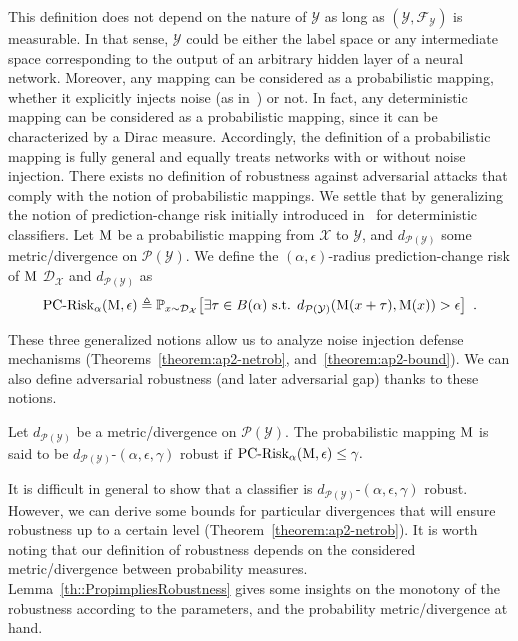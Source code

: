 This definition does not depend on the nature of $\mathcal{Y}$ as long as $(\mathcal{Y},\mathcal{F}_{\mathcal{Y}})$ is measurable.
In that sense, $\mathcal{Y}$ could be either the label space or any intermediate space corresponding to the output of an arbitrary hidden layer of a neural network.
Moreover, any mapping can be considered as a probabilistic mapping, whether it explicitly injects noise (as in~\cite{lecuyer2018certified,rakin2018parametric,dhillon2018stochastic}) or not.
In fact, any deterministic mapping can be considered as a probabilistic mapping, since it can be characterized by a Dirac measure.
Accordingly, the definition of a probabilistic mapping is fully general and equally treats networks with or without noise injection.
There exists no definition of robustness against adversarial attacks that comply with the notion of probabilistic mappings.
We settle that by generalizing the notion of prediction-change risk initially introduced in~\cite{diochnos2018adversarial} for deterministic classifiers.
Let $\operatorname*{M}$ be a probabilistic mapping from $\mathcal{X}$ to $\mathcal{Y}$, and $d_{\mathcal{P}(\mathcal{Y})}$ some metric/divergence on $\mathcal{P}(\mathcal{Y})$.
We define the $(\alpha,\epsilon)$-radius prediction-change risk of $\operatorname*{M}$ \wrt $\mathcal{D}_{\mathcal{X}}$ and $d_{\mathcal{P}(\mathcal{Y})}$ as 
\begin{equation}
  \PCadvRisk(\probmap,\epsilon) \triangleq  \mathbb{P}_{x\sim \mathcal{D}_{\mathcal{X}}}\left[ \exists \tau \in B(\alpha) \text{ s.t. } d_{\mathcal{P}(\mathcal{Y})}(\probmap(x+\tau),\probmap(x)) > \epsilon \right] \enspace.
\end{equation}

These three generalized notions allow us to analyze noise injection defense mechanisms (Theorems~\ref{theorem:ap2-netrob}, and~\ref{theorem:ap2-bound}).
We can also define adversarial robustness (and later adversarial gap) thanks to these notions. 

\begin{definition}
  Let $d_{\mathcal{P}(\mathcal{Y})}$ be a metric/divergence on $\mathcal{P}(\mathcal{Y})$.
  The probabilistic mapping $\operatorname*{M}$ is said to be $d_{\mathcal{P}(\mathcal{Y})}$-$(\alpha, \epsilon, \gamma)$ robust if $\operatorname*{PC-Risk_{\alpha}}(\operatorname*{M},\epsilon) \leq \gamma.$ 
  \label{def::GeneralizedRobustness}
\end{definition}

It is difficult in general to show that a classifier is $d_{\mathcal{P}(\mathcal{Y})}$-$(\alpha, \epsilon, \gamma)$ robust.
However, we can  derive some bounds for particular divergences that will ensure robustness up to a certain level (Theorem~\ref{theorem:ap2-netrob}).
It is worth noting that our definition of robustness depends on the considered metric/divergence between probability measures.
Lemma~\ref{th::PropimpliesRobustness} gives some insights on the monotony of the robustness according to the parameters, and the probability metric/divergence at hand.

